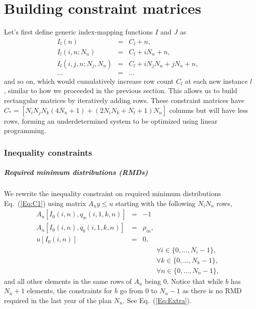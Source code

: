 \documentclass{report}[fleqn,12pt]
\begin{document}
\chapter{Building constraint matrices}
Let's first define generic index-mapping functions $I$ and $J$ as
\begin{eqnarray}
	\label{Eq:Offsets}
	I_l(n) &=& C_l + n, \nonumber \\
	I_l(i, n; N_n) &=& C_l + iN_n + n, \nonumber \\
	I_l(i, j, n; N_j, N_n) &=& C_l + iN_j N_n + jN_n +n, \\
	\ldots &=& \ldots \nonumber
\end{eqnarray}
and so on, which would cumulatively increase row count $C_l$ at each new instance $l$,
similar to how we proceeded in the previous section.
This allows us to build rectangular matrices by iteratively adding rows.
These constraint matrices have
$C_* = [N_iN_jN_k(4N_n + 1) + (2N_iN_k + N_t + 1) N_n]$
columns but will have less rows,
forming an underdetermined system to be optimized using linear programming.

\subsection{Inequality constraints}

\paragraph*{Required minimum distributions (RMDs)}
We rewrite the inequality constraint on required minimum distributions
Eq.~(\ref{Eq:C1}) using matrix $A_{u}y \le u$ starting with the following $N_iN_n$ rows, 
\begin{eqnarray}
	A_u[I_0(i, n), q_w(i, 1, k, n)] &=& -1 \nonumber \\
	A_u[I_0(i, n), q_b(i, 1, k, n)] &=& \rho_{in}, \nonumber \\
	u[I_0(i, n)] &=& 0, \\
	&&\qquad\forall i \in \{0,\ldots, N_i-1\}, \nonumber\\
	&&\qquad\forall k \in \{0,\ldots, N_k-1\}, \nonumber\\
	&&\qquad\forall n \in \{0,\ldots, N_n -1\},\nonumber
\end{eqnarray}
and all other elements in the same rows of $A_u$ being $0$.
Notice that while $b$ has $N_n+1$ elements, the constraints
for $b$ go from $0$ to $N_n-1$ as there is no RMD required in the last year of the plan $N_n$.
See Eq.~(\ref{Eq:Extra}).
\end{document}
